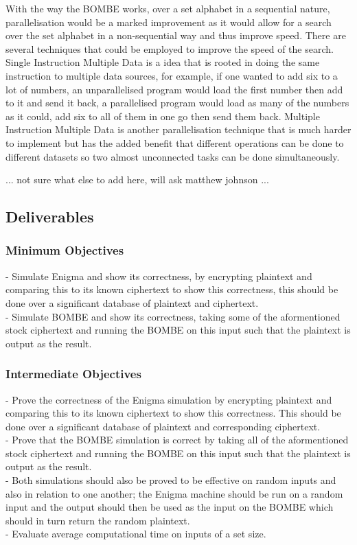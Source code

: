 \documentclass[12pt,a4paper]{article}
\begin{document}
With the way the BOMBE works, over a set alphabet in a sequential nature, parallelisation would be a marked improvement as it would allow for a search over the set alphabet in a non-sequential way and thus improve speed. There are several techniques that could be employed to improve the speed of the search. Single Instruction Multiple Data is a idea that is rooted in doing the same instruction to multiple data sources, for example, if one wanted to add six to a lot of numbers, an unparallelised program would load the first number then add to it and send it back, a parallelised program would load as many of the numbers as it could, add six to all of them in one go then send them back. Multiple Instruction Multiple Data is another parallelisation technique that is much harder to implement but has the added benefit that different operations can be done to different datasets so two almost unconnected tasks can be done simultaneously. 

...
not sure what else to add here, will ask matthew johnson
...

\subsection{Deliverables}

\subsubsection{Minimum Objectives}

- Simulate Enigma and show its correctness, by encrypting plaintext and comparing this to its known ciphertext to show this correctness, this should be done over a significant database of plaintext and ciphertext.\\
- Simulate BOMBE and show its correctness, taking some of the aformentioned stock ciphertext and running the BOMBE on this input such that the plaintext is output as the result.

\subsubsection{Intermediate Objectives}

- Prove the correctness of the Enigma simulation by encrypting plaintext and comparing this to its known ciphertext to show this correctness. This should be done over a significant database of plaintext and corresponding  ciphertext.\\
- Prove that the BOMBE simulation is correct by taking all of the aformentioned stock ciphertext and running the BOMBE on this input such that the plaintext is output as the result.\\
- Both simulations should also be proved to be effective on random inputs and also in relation to one another; the Enigma machine should be run on a random input and the output should then be used as the input on the BOMBE which should in turn return the random plaintext.\\
- Evaluate average computational time on inputs of a set size.
\end{document}
